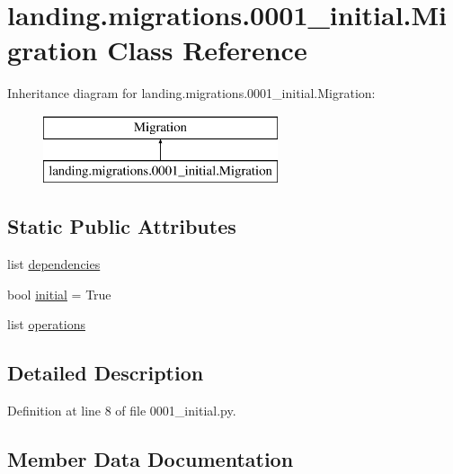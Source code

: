 \hypertarget{classlanding_1_1migrations_1_10001__initial_1_1Migration}{}\section{landing.\+migrations.0001\+\_\+initial.Migration Class Reference}
\label{classlanding_1_1migrations_1_10001__initial_1_1Migration}
Inheritance diagram for landing.\+migrations.0001\+\_\+initial.Migration\+:\begin{figure}[H]
\begin{center}
\leavevmode
\includegraphics[height=2.000000cm]{classlanding_1_1migrations_1_10001__initial_1_1Migration}
\end{center}
\end{figure}
\subsection*{Static Public Attributes}
\begin{DoxyCompactItemize}
\item 
list \mbox{\hyperlink{classlanding_1_1migrations_1_10001__initial_1_1Migration_a7ae8330b1f6f4c2d840e8988b36a4273}{dependencies}}
\item 
bool \mbox{\hyperlink{classlanding_1_1migrations_1_10001__initial_1_1Migration_a4de7b3a61ec6f60906e74358f823c43c}{initial}} = True
\item 
list \mbox{\hyperlink{classlanding_1_1migrations_1_10001__initial_1_1Migration_abbd7e42fa7ac2174a9fc7593b13b3f23}{operations}}
\end{DoxyCompactItemize}


\subsection{Detailed Description}


Definition at line 8 of file 0001\+\_\+initial.\+py.



\subsection{Member Data Documentation}
\mbox{\label{classlanding_1_1migrations_1_10001__initial_1_1Migration_a7ae8330b1f6f4c2d840e8988b36a4273}} 
